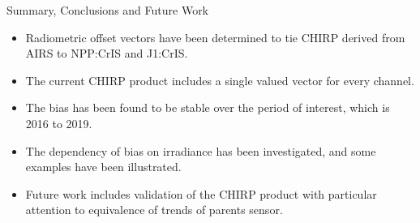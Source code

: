 \documentclass[10pt,t]{beamer}
\begin{document}
%
%    
%
\begin{frame}{Summary, Conclusions and Future Work}

  \begin{itemize}
  \item Radiometric offset vectors have been determined to tie CHIRP derived from AIRS to NPP:CrIS and J1:CrIS.
  \item The current CHIRP product includes a single valued vector for every channel.
  \item The bias has been found to be stable over the period of interest, which is 2016 to 2019.
  \item The dependency of bias on irradiance has been investigated, and some examples have been illustrated.
  \item Future work includes validation of the CHIRP product with particular attention to equivalence of trends of parents sensor.
    
  \end{itemize}
  

\end{frame}


\end{document}
